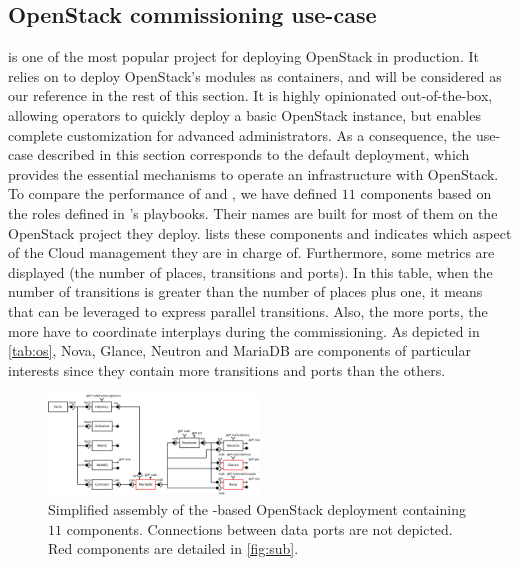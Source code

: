 \subsection{OpenStack commissioning use-case}

\begin{table}
  \begin{center}
    
    \caption{Number of places, transitions, ports and roles for each \mad component
        of the OpenStack assembly of Figure~\ref{fig:full}.}
    \label{tab:os}
  \end{center}
\end{table}


\kolla is one of the most popular project for deploying OpenStack in production.
It relies on \ansible to deploy OpenStack's modules as \docker containers, and
will be considered as our reference in the rest of this section. It is highly
opinionated out-of-the-box, allowing operators to quickly deploy a basic
OpenStack instance, but enables complete customization for advanced
administrators. As a consequence, the use-case described in this section
corresponds to the default \kolla deployment, which provides the essential
mechanisms to operate an infrastructure with OpenStack.
%
To compare the performance of \kolla and \mad, we have defined $11$ \mad
components based on the \ansible roles defined in \kolla's playbooks. Their
names are built for most of them on the OpenStack project they deploy.
 lists these components and indicates which aspect of the Cloud
management they are in charge of. Furthermore, some \mad metrics are displayed
(\ie the number of places, transitions and ports).
%
In this table, when the number of transitions is greater than the
number of places plus one, it means that \mad can be leveraged to
express parallel transitions.  Also, the more ports, the more \mad
have to coordinate interplays during the commissioning. As depicted in
\cref{tab:os}, Nova, Glance, Neutron and MariaDB are components of
particular interests since they contain more transitions and ports
than the others.

\begin{figure}
  \begin{center}
    \includegraphics[width=0.5\textwidth]{./images/full.pdf}
    \caption{Simplified \mad assembly of the \kolla-based OpenStack deployment
    containing $11$ components. Connections between data ports are not depicted.
    Red components are detailed in \cref{fig:sub}.}
    \label{fig:full}
  \end{center}
\end{figure}

